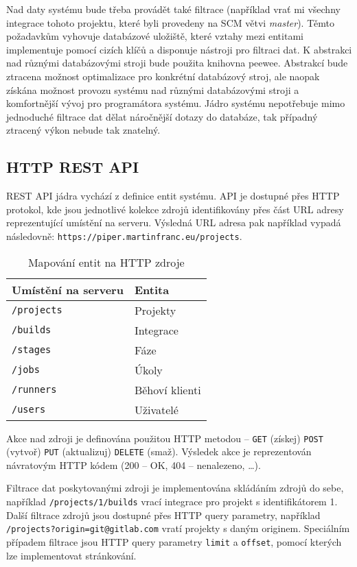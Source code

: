 
Nad daty systému bude třeba provádět také filtrace (například vrať mi všechny integrace tohoto projektu, které byli provedeny na SCM větvi \textit{master}).
Těmto požadavkům vyhovuje databázové uložiště, které vztahy mezi entitami implementuje pomocí cizích klíčů a disponuje nástroji pro filtraci dat.
K abstrakci nad různými databázovými stroji bude použita knihovna peewee.
Abstrakcí bude ztracena možnost optimalizace pro konkrétní databázový stroj, ale naopak získána možnost provozu systému nad různými databázovými stroji a komfortnější vývoj pro programátora systému.
Jádro systému nepotřebuje mimo jednoduché filtrace dat dělat náročnější dotazy do databáze, tak případný ztracený výkon nebude tak znatelný.

\subsection{HTTP REST API}

REST API jádra vychází z definice entit systému.
API je dostupné přes HTTP protokol, kde jsou jednotlivé kolekce zdrojů identifikovány přes část URL adresy reprezentující umístění na serveru.
Výsledná URL adresa pak například vypadá následovně: \verb|https://piper.martinfranc.eu/projects|.

\begin{table}[ht]
\centering
\caption{Mapování entit na HTTP zdroje}
\begin{tabular}{|l|l|}
\hline
Umístění na serveru & Entita \\ \hline
\verb|/projects| & Projekty \\ \hline
\verb|/builds| & Integrace \\ \hline
\verb|/stages| & Fáze \\ \hline
\verb|/jobs| & Úkoly \\ \hline
\verb|/runners| & Běhoví klienti \\ \hline
\verb|/users| & Uživatelé \\ \hline
\end{tabular}
\end{table}

Akce nad zdroji je definována použitou HTTP metodou -- \verb|GET| (získej) \verb|POST| (vytvoř) \verb|PUT| (aktualizuj) \verb|DELETE| (smaž).
Výsledek akce je reprezentován návratovým HTTP kódem (200 -- OK, 404 -- nenalezeno, \ldots).

Filtrace dat poskytovanými zdroji je implementována skládáním zdrojů do sebe, například \verb|/projects/1/builds| vrací integrace pro projekt s identifikátorem 1.
Další filtrace zdrojů jsou dostupné přes HTTP query parametry, například \verb|/projects?origin=git@gitlab.com| vratí projekty s daným originem.
Speciálním případem filtrace jsou HTTP query parametry \verb|limit| a \verb|offset|, pomocí kterých lze implementovat stránkování.

